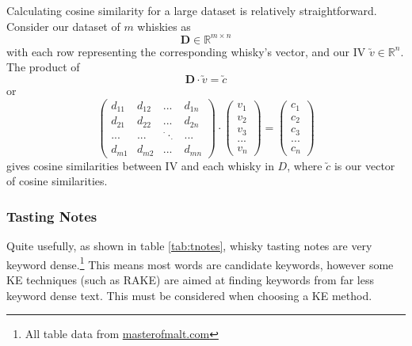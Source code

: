 Calculating cosine similarity for a large dataset is relatively straightforward.
Consider our dataset of $m$ whiskies as
\begin{equation}
    \textbf{D} \in \mathbb{R}^{m \times n}
\end{equation}
with each row representing the corresponding whisky's vector, and our IV $\utilde{v} \in \mathbb{R}^{n}$.
The product of 
\begin{equation}
    \textbf{D} \cdot \utilde{v} = \utilde{c}    
\end{equation}
or 
\begin{equation}\label{eqn:cossim}
    \begin{pmatrix}
        d_{11} & d_{12} & ... & d_{1n}\\
        d_{21} & d_{22} & ... & d_{2n}\\
        ...    & ...    & ^{\cdot}\cdot _{\cdot} & ...   \\
        d_{m1} & d_{m2} & ... & d_{mn}
    \end{pmatrix}
    \cdot
    \begin{pmatrix}
        v_1 \\ v_2 \\ v_3 \\ ... \\ v_n
    \end{pmatrix}
    =
    \begin{pmatrix}
        c_1 \\ c_2 \\ c_3 \\ ... \\ c_n
    \end{pmatrix}
\end{equation}
gives cosine similarities between IV and each whisky in $D$, where $\utilde{c}$ is our vector of cosine similarities.




\subsubsection{Tasting Notes}\label{ssec:tnotes}
Quite usefully, as shown in table \ref{tab:tnotes}, whisky tasting notes are very keyword dense.\footnote{All table data from \href{http://masterofmalt.com/}{masterofmalt.com}}
This means most words are candidate keywords, however some KE techniques (such as RAKE) are aimed at 
finding keywords from far less keyword dense text. This must be considered when choosing a KE method.


